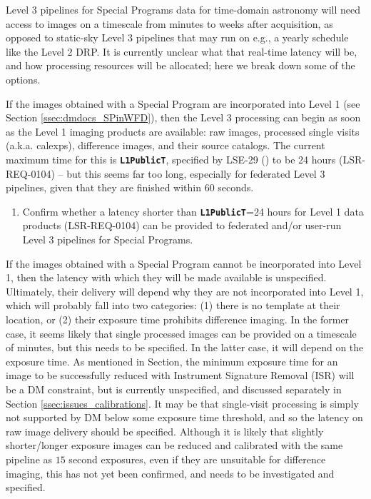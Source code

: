 \documentclass[DM,lsstdraft,toc]{lsstdoc}
\begin{document}
Level 3 pipelines for Special Programs data for time-domain astronomy will need access to images on a timescale from minutes to weeks after acquisition, as opposed to static-sky Level 3 pipelines that may run on e.g., a yearly schedule like the Level 2 DRP. It is currently unclear what that real-time latency will be, and how processing resources will be allocated; here we break down some of the options.

If the images obtained with a Special Program are incorporated into Level 1 (see Section \ref{ssec:dmdocs_SPinWFD}), then the Level 3 processing can begin as soon as the Level 1 imaging products are available: raw images, processed single visits (a.k.a. calexps), difference images, and their source catalogs. The current maximum time for this is {\tt \textbf{L1PublicT}}, specified by LSE-29 (\citep{LSE-29}) to be 24 hours (LSR-REQ-0104) -- but this seems far too long, especially for federated Level 3 pipelines, given that they are finished within $60$ seconds.

\begin{enumerate}[resume,topsep=-10pt,label= \textbf{Concern \Roman*.}] \item \label{C2} Confirm whether a latency shorter than {\tt \textbf{L1PublicT}}=24 hours for Level 1 data products (LSR-REQ-0104) can be provided to federated and/or user-run Level 3 pipelines for Special Programs. \end{enumerate}

If the images obtained with a Special Program cannot be incorporated into Level 1, then the latency with which they will be made available is unspecified. Ultimately, their delivery will depend why they are not incorporated into Level 1, which will probably fall into two categories: (1) there is no template at their location, or (2) their exposure time prohibits difference imaging. In the former case, it seems likely that single processed images can be provided on a timescale of minutes, but this needs to be specified. In the latter case, it will depend on the exposure time. As mentioned in Section\label{ssec:dmdocs_SPinWFD_L1}, the minimum exposure time for an image to be successfully reduced with Instrument Signature Removal (ISR) will be a DM constraint, but is currently unspecified, and discussed separately in Section \ref{ssec:issues_calibrations}. It may be that single-visit processing is simply not supported by DM below some exposure time threshold, and so the latency on raw image delivery should be specified. Although it is likely that slightly shorter/longer exposure images can be reduced and calibrated with the same pipeline as $15$ second exposures, even if they are unsuitable for difference imaging, this has not yet been confirmed, and needs to be investigated and specified.
\end{document}
